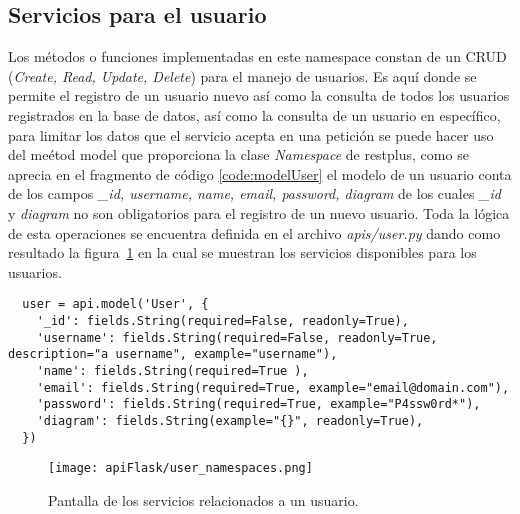 \subsection{Servicios para el usuario}

Los métodos o funciones implementadas en este namespace constan de un CRUD (\textit{Create, Read, Update, Delete}) para el manejo de usuarios. Es aquí donde se permite el registro de un usuario nuevo así como la consulta de todos los usuarios registrados en la base de datos, así como la consulta de un usuario en específico, para limitar los datos que el servicio acepta en una petición se puede hacer uso del meétod model que proporciona la clase \textit{Namespace} de restplus, como se aprecia en el fragmento de código \ref{code:modelUser} el modelo de un usuario conta de los campos \textit{\_id, username, name, email, password, diagram} de los cuales \textit{\_id} y \textit{diagram} no son obligatorios para el registro de un nuevo usuario. Toda la lógica de esta operaciones se encuentra definida en el archivo \textit{apis/user.py} dando como resultado la figura~\ref{img:userEndpoints} en la cual se muestran los servicios disponibles para los usuarios.


\begin{code}
\label{code:modelUser}
\begin{verbatim}
  user = api.model('User', {
    '_id': fields.String(required=False, readonly=True),
    'username': fields.String(required=False, readonly=True, description="a username", example="username"),
    'name': fields.String(required=True ),
    'email': fields.String(required=True, example="email@domain.com"),
    'password': fields.String(required=True, example="P4ssw0rd*"),
    'diagram': fields.String(example="{}", readonly=True),
  })

\end{verbatim}
\end{code}

\begin{figure}[H]
  \centering
  \texttt{[image: apiFlask/user\_namespaces.png]}
  \caption{Pantalla de los servicios relacionados a un usuario.}
  \label{img:userEndpoints}
\end{figure}